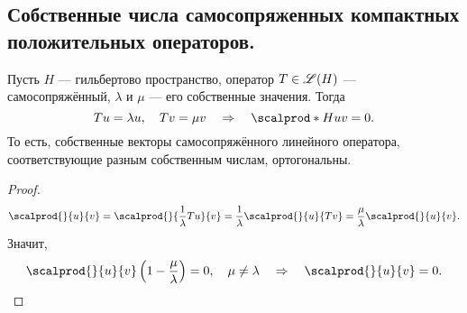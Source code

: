 
\subsection{Собственные числа самосопряженных компактных положительных операторов.}
\begin{prop} Пусть $H$ --- гильбертово пространство, оператор $T \in \mathscr{L}(H)$ --- самосопряжённый, $\lambda$ и $\mu$ --- его собственные значения. Тогда
$$ Tu = \lambda u, \quad Tv = \mu v \quad \Rightarrow \quad \scalprod*{H}{u}{v} = 0.$$
То есть, собственные векторы самосопряжённого линейного оператора, соответствующие разным собственным числам, ортогональны.
\end{prop}
\begin{proof}

$$\scalprod{}{u}{v} = \scalprod{}{\frac{1}{\lambda} T u}{v} = \frac{1}{\lambda} \scalprod{}{u}{Tv} = \frac {\mu}{\lambda} \scalprod{}{u}{v}.$$
Значит,
$$ \scalprod{}{u}{v} \left( 1 - \frac{\mu}{\lambda} \right) = 0, \quad \mu \neq \lambda \quad \Rightarrow \quad \scalprod{}{u}{v} = 0.$$

\end{proof}

